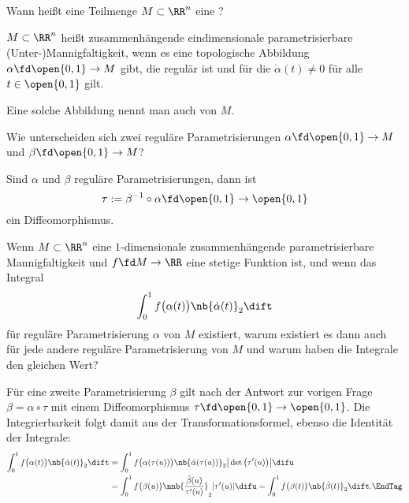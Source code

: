 \begin{frage}
  Wann heißt eine Teilmenge $M\subset\RR^n$ eine 
  ?
\end{frage}

\begin{antwort}
  $M\subset\RR^n$ heißt zusammenhängende eindimensionale parametrisierbare 
  (Unter-)Mannigfaltigkeit, wenn es eine topologische Abbildung 
  $\alpha\fd\open{0,1} \to M$ gibt, die regulär ist und 
  für die $\dot{\alpha}(t)\not=0$ für alle $t\in\open{0,1}$ gilt.

  Eine solche Abbildung nennt man auch  
  von $M$. 
  \AntEnd
\end{antwort}

\begin{frage}
  Wie unterscheiden sich zwei reguläre Parametrisierungen 
  $\alpha\fd\open{0,1}\to M$ und 
  $\beta\fd\open{0,1}\to M$?
\end{frage}

\begin{antwort}
  Sind $\alpha$ und $\beta$ reguläre Parametrisierungen, dann ist 
  \[
  \tau := \beta^{-1}\circ\alpha \fd \open{0,1}\to\open{0,1} 
  \]
  ein Diffeomorphismus.
  \AntEnd
\end{antwort}

\begin{frage}
  Wenn $M\subset\RR^n$ eine $1$-dimensionale 
  zusammenhängende parametrisierbare Mannigfaltigkeit und 
  $f\fd M\to\RR$ eine stetige Funktion ist, und wenn das Integral 
  \[
  \int_0^1  f\big(\alpha( t)\big) \nb{ \dot{\alpha}(t)}_2 \dift 
  \]
  für  reguläre Parametrisierung $\alpha$ von $M$ 
  existiert, warum existiert es dann auch für jede andere reguläre 
  Parametrisierung von $M$ und warum haben die Integrale den gleichen Wert?
\end{frage}

\begin{antwort}
  Für eine zweite Parametrisierung $\beta$ gilt 
  nach der Antwort zur vorigen Frage $\beta =\alpha\circ\tau$ 
  mit einem Diffeomorphismus $\tau\fd\open{0,1}\to\open{0,1}$. 
  Die Integrierbarkeit folgt damit aus der Transformationsformel, 
  ebenso die Identität der Integrale:
  \begin{align*}
    \int_0^1  f\big(\alpha( t)\big) \nb{ \dot{\alpha}(t)}_2 \dift &= 
    \int_0^1  f\big(\alpha( \tau(u) )\big) \nb{ \dot{\alpha}(\tau(u))}_2 
    \big|\det \big( \tau'(u) \big)\big|\difu \\ &= 
    \int_0^1  f\big( \beta(u) \big) \nnb{ \frac{\dot{\beta}(u)}{\tau'(u)} }_2 
    |\tau'(u)|\difu = 
    \int_0^1  f\big( \beta(t) \big) \nb{ \dot{\beta}(t)}_2 \dift. \EndTag
  \end{align*}
\end{antwort} 

